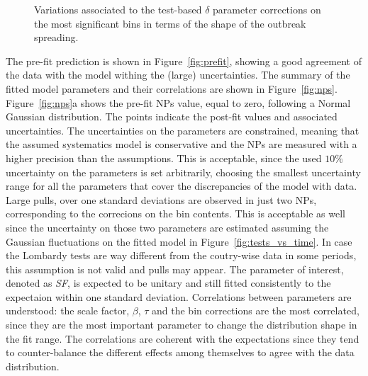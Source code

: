 \begin{figure}
\centering
{}
  \caption{Variations associated to the test-based $\delta$ parameter corrections on the most significant bins in terms of the shape of the outbreak spreading.}
  \label{fig:syst_np_corrbin}
\end{figure}

The pre-fit prediction is shown in Figure~\ref{fig:prefit}, showing a good agreement of the data with the model withing the (large) uncertainties. The summary of the fitted model parameters and their correlations are shown in Figure~\ref{fig:nps}. Figure~\ref{fig:nps}a shows the pre-fit NPs value, equal to zero, following a Normal Gaussian distribution. The points indicate the post-fit values and associated uncertainties. The uncertainties on the parameters are constrained, meaning that the assumed systematics model is conservative and the NPs are measured with a higher precision than the assumptions. This is acceptable, since the used $10\%$ uncertainty on the parameters is set arbitrarily, choosing the smallest uncertainty range for all the parameters that cover the discrepancies of the model with data. Large pulls, over one standard deviations are observed in just two NPs, corresponding to the correcions on the bin contents. This is acceptable as well since the  uncertainty on those two parameters are estimated assuming the Gaussian fluctuations on the fitted model in Figure~\ref{fig:tests_vs_time}. In case the Lombardy tests are way different from the coutry-wise data in some periods, this assumption is not valid and pulls may appear. The parameter of interest, denoted as \emph{SF}, is expected to be unitary and still fitted consistently to the expectaion within one standard deviation. Correlations between parameters are understood: the scale factor, $\beta$, $\tau$ and the bin corrections are the most correlated, since they are the most important parameter to change the distribution shape in the fit range. The correlations are coherent with the expectations since they tend to counter-balance the different effects among themselves to agree with the data distribution. \\

